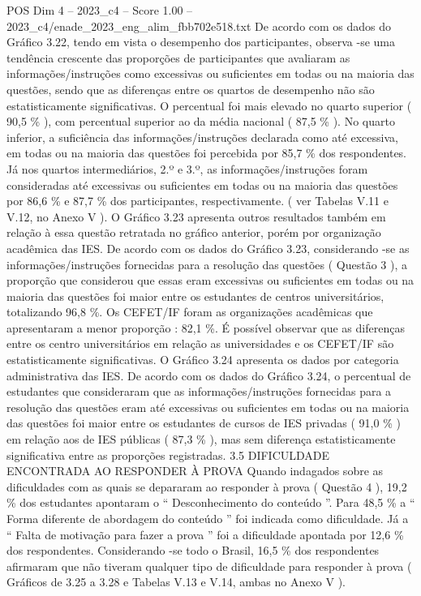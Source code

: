 \begin{textsample}{POS Dim 4 – 2023\_c4 – Score 1.00 – 2023\_c4/enade\_2023\_eng\_alim\_fbb702e518.txt}
De acordo com os dados do Gráfico 3.22, tendo em vista o desempenho dos participantes, observa -se uma tendência crescente das proporções de participantes que avaliaram as informações/instruções como excessivas ou suficientes em todas ou na maioria das questões, sendo que as diferenças entre os quartos de desempenho não são estatisticamente significativas.
O percentual foi mais elevado no quarto superior ( 90,5 \% ), com percentual superior ao da média nacional ( 87,5 \% ).
No quarto inferior, a suficiência das informações/instruções declarada como até excessiva, em todas ou na maioria das questões foi percebida por 85,7 \% dos respondentes.
Já nos quartos intermediários, 2.º e 3.º, as informações/instruções foram consideradas até excessivas ou suficientes em todas ou na maioria das questões por 86,6 \% e 87,7 \% dos participantes, respectivamente. ( ver Tabelas V.11 e V.12, no Anexo V ).
O Gráfico 3.23 apresenta outros resultados também em relação à essa questão retratada no gráfico anterior, porém por organização acadêmica das IES.
De acordo com os dados do Gráfico 3.23, considerando -se as informações/instruções fornecidas para a resolução das questões ( Questão 3 ), a proporção que considerou que essas eram excessivas ou suficientes em todas ou na maioria das questões foi maior entre os estudantes de centros universitários, totalizando 96,8 \%.
Os CEFET/IF foram as organizações acadêmicas que apresentaram a menor proporção : 82,1 \%.
É possível observar que as diferenças entre os centro universitários em relação as universidades e os CEFET/IF são estatisticamente significativas.
O Gráfico 3.24 apresenta os dados por categoria administrativa das IES.
De acordo com os dados do Gráfico 3.24, o percentual de estudantes que consideraram que as informações/instruções fornecidas para a resolução das questões eram até excessivas ou suficientes em todas ou na maioria das questões foi maior entre os estudantes de cursos de IES privadas ( 91,0 \% ) em relação aos de IES públicas ( 87,3 \% ), mas sem diferença estatisticamente significativa entre as proporções registradas. 3.5 DIFICULDADE ENCONTRADA AO RESPONDER À PROVA Quando indagados sobre as dificuldades com as quais se depararam ao responder à prova ( Questão 4 ), 19,2 \% dos estudantes apontaram o “ Desconhecimento do conteúdo ”.
Para 48,5 \% a “ Forma diferente de abordagem do conteúdo ” foi indicada como dificuldade.
Já a “ Falta de motivação para fazer a prova ” foi a dificuldade apontada por 12,6 \% dos respondentes.
Considerando -se todo o Brasil, 16,5 \% dos respondentes afirmaram que não tiveram qualquer tipo de dificuldade para responder à prova ( Gráficos de 3.25 a 3.28 e Tabelas V.13 e V.14, ambas no Anexo V ).

\end{textsample}
